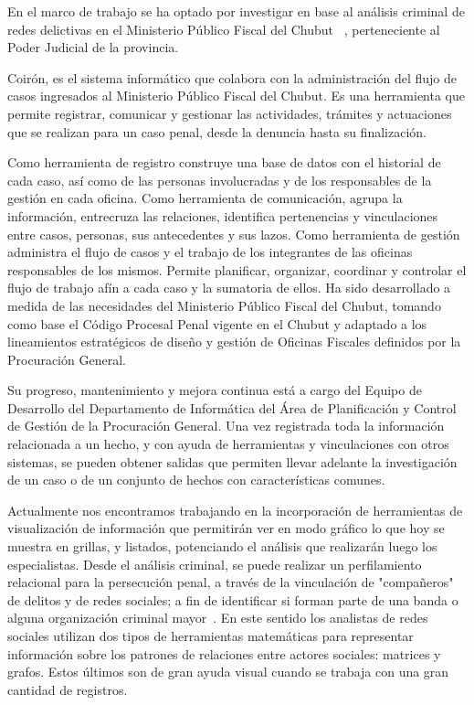 En el marco de trabajo se ha optado por investigar en base al análisis criminal de redes delictivas en el Ministerio Público Fiscal del Chubut ~\cite{ref_article30}, perteneciente al Poder Judicial de la provincia.

Coirón, es el sistema informático que colabora con la administración del flujo de casos ingresados al Ministerio Público Fiscal del Chubut. Es una herramienta que permite registrar, comunicar y gestionar las actividades, trámites y actuaciones que se realizan para un caso penal, desde la denuncia hasta su finalización.

Como herramienta de registro construye una base de datos con el historial de cada caso, así como de las personas involucradas y de los responsables de la gestión en cada oficina. Como herramienta de comunicación, agrupa la información, entrecruza las relaciones, identifica pertenencias y vinculaciones entre casos, personas, sus antecedentes y sus lazos. Como herramienta de gestión administra el flujo de casos y el trabajo de los integrantes de las oficinas responsables de los mismos. Permite planificar, organizar, coordinar y controlar el flujo de trabajo afín a cada caso y la sumatoria de ellos.
Ha sido desarrollado a medida de las necesidades del Ministerio Público Fiscal del Chubut, tomando como base el Código Procesal Penal vigente en el Chubut y adaptado a los lineamientos estratégicos de diseño y gestión de Oficinas Fiscales definidos por la Procuración General.

Su progreso, mantenimiento y mejora continua está a cargo del Equipo de Desarrollo del Departamento de Informática del Área de Planificación y Control de Gestión de la Procuración General. Una vez registrada toda la información relacionada a un hecho, y con ayuda de herramientas y vinculaciones con otros sistemas, se pueden obtener salidas que permiten llevar adelante la investigación de un caso o de un conjunto de hechos con características comunes.

Actualmente nos encontramos trabajando en la incorporación de herramientas de visualización de información que permitirán ver en modo gráfico lo que hoy se muestra en grillas, y listados, potenciando el análisis que realizarán luego los especialistas. Desde el análisis criminal, se puede realizar un perfilamiento relacional para la persecución penal, a través de la vinculación de "compañeros" de delitos y de redes sociales; a fin de identificar si forman parte de una banda o alguna organización criminal mayor~\cite{ref_article31}. En este sentido los analistas de redes sociales utilizan dos tipos de herramientas matemáticas para representar información sobre los patrones de relaciones entre actores sociales: matrices y grafos. Estos últimos son de gran ayuda visual cuando se trabaja con una gran cantidad de registros.

